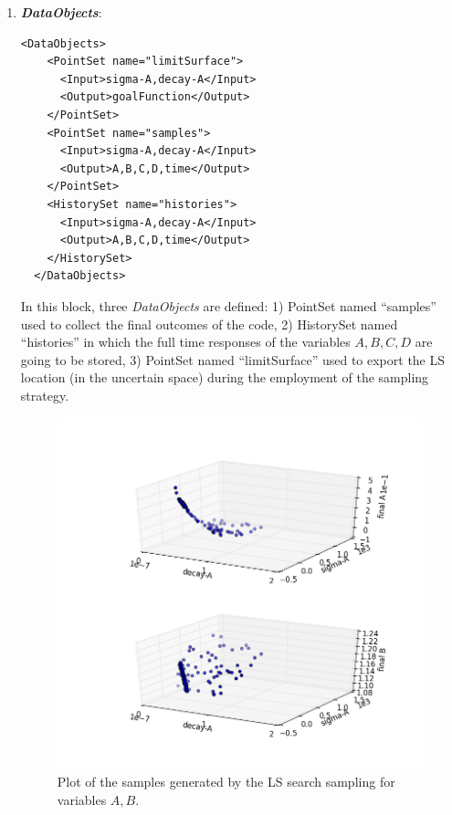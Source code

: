 \begin{enumerate}
   \item \textbf{\textit{DataObjects}}:
\begin{lstlisting}[style=XML,morekeywords={arg,extension,pauseAtEnd,overwrite}]
  <DataObjects>
    <PointSet name="limitSurface">
      <Input>sigma-A,decay-A</Input>
      <Output>goalFunction</Output>
    </PointSet>
    <PointSet name="samples">
      <Input>sigma-A,decay-A</Input>
      <Output>A,B,C,D,time</Output>
    </PointSet>
    <HistorySet name="histories">
      <Input>sigma-A,decay-A</Input>
      <Output>A,B,C,D,time</Output>
    </HistorySet>
  </DataObjects>
\end{lstlisting}
  In this block, three \textit{DataObjects} are defined: 1) PointSet
  named ``samples'' used to collect the final outcomes of the code, 2)
  HistorySet named ``histories'' in which the full time responses of the
  variables $A,B,C,D$ are going to be stored, 3) PointSet named
  ``limitSurface'' used  to export the LS location (in the uncertain space) during the employment of the sampling strategy.
 \begin{figure}[h!]
  \centering
  \includegraphics[scale=0.7]{pics/LS_pointsets.png}
  \caption{Plot of the samples generated by the LS search sampling for variables $A,B$.}
  \label{fig:LS_pointsets}

\end{figure}
\end{enumerate}
